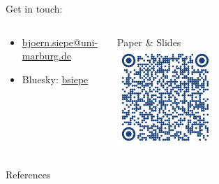 \documentclass[english, 12pt, aspectratio=169]{beamer}
\begin{document}
\begin{frame}
Get in touch: 
\begin{columns}

\begin{column}{0.5\textwidth}
\begin{itemize}
\item \faEnvelope \hspace{0.1em} \href{mailto:bjoern.siepe@uni-marburg.de)}{bjoern.siepe@uni-marburg.de}
\item Bluesky: \hspace{0.1em} \href{https://bsky.app/profile/bsiepe.bsky.social}{bsiepe}
\end{itemize}
\end{column}

\begin{column}{0.5\textwidth}

\centering
Paper \& Slides \\
\includegraphics[width = 0.4\textwidth]{pics/dagstat_qr.png}

\end{column}

\end{columns}





\end{frame}


\begin{frame}[allowframebreaks]{References}
\scriptsize
  
  
\end{frame}
\end{document}
